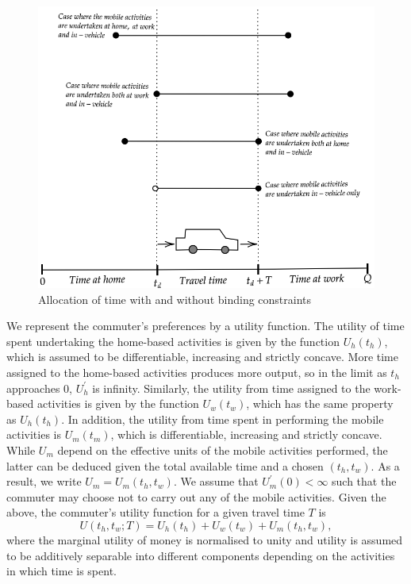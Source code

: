 \documentclass[12pt,a4paper,british]{article}
\begin{document}
\begin{figure}[ht!]
    \centering
    \includegraphics[width=0.5\textheight]{allocationPossibilities.png}
    \caption{Allocation of time with and without binding constraints}
	\label{fig:time_allocation}
\end{figure}

We represent the commuter's preferences by a utility function. The utility of time spent undertaking the home-based activities is given by the function $U_h(t_h)$, which is assumed to be differentiable, increasing and strictly concave. More time assigned to the home-based activities produces more output, so in the limit as $t_h$ approaches 0, $U_h^{\prime}$ is infinity. Similarly, the utility from time assigned to the work-based activities is given by the function $U_w(t_w)$, which has the same property as $U_h(t_h)$. In addition, the utility from time spent in performing the mobile activities is $U_m(t_m)$, which is differentiable, increasing and strictly concave. While $U_m$ depend on the effective units of the mobile activities performed, the latter can be deduced given the total available time and a chosen $\left(t_h, t_w\right)$. As a result, we write $U_m = U_m\left(t_h, t_w\right)$. We assume that $U_{m}^{\prime}\left(0\right) < \infty$ such that the commuter may choose not to carry out any of the mobile activities. Given the above, the commuter's utility function for a given travel time $T$ is%
\begin{equation}
	U\left(t_{h},t_{w};T\right)=U_{h}\left(t_{h}\right)+U_{w}\left(t_{w}\right)+ U_{m}\left(t_{h}, t_{w}\right),
	\label{eq:utility0}
\end{equation} %
where the marginal utility of money is normalised to unity and utility is assumed to be additively separable into different components depending on the activities in which time is spent. 
\end{document}

